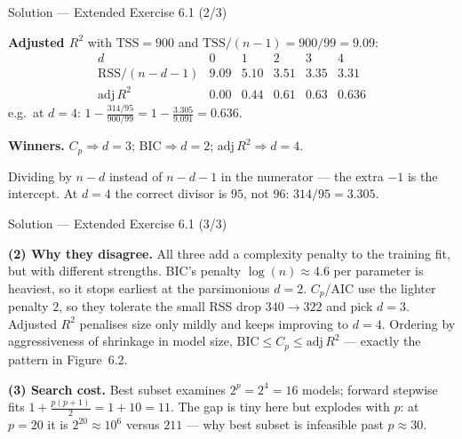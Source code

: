 \documentclass[aspectratio=169,11pt]{beamer}
\begin{document}
\begin{frame}{Solution --- Extended Exercise 6.1 (2/3)}
  \begin{solutionbox}
    \textbf{Adjusted $R^2$} with $\mathrm{TSS}=900$ and
    $\mathrm{TSS}/(n-1)=900/99=9.09$:
    \[
      \begin{array}{c|ccccc}
        d & 0 & 1 & 2 & 3 & 4\\\hline
        \mathrm{RSS}/(n\!-\!d\!-\!1) & 9.09 & 5.10 & 3.51 & 3.35 & 3.31\\[1pt]
        \mathrm{adj}\,R^2 & 0.00 & 0.44 & 0.61 & 0.63 & \mathbf{0.636}
      \end{array}
    \]
    e.g.\ at $d=4$: $1-\tfrac{314/95}{900/99}=1-\tfrac{3.305}{9.091}
    =0.636$.

    \textbf{Winners.} $C_p\Rightarrow d=3$;\quad
    $\mathrm{BIC}\Rightarrow d=2$;\quad
    $\mathrm{adj}\,R^2\Rightarrow d=4$.
  \end{solutionbox}
  \begin{mistake}
    Dividing by $n - d$ instead of $n - d - 1$ in the numerator --- the
    extra $-1$ is the intercept. At $d = 4$ the correct divisor is $95$,
    not $96$: $314/95 = 3.305$.
  \end{mistake}
\end{frame}

\begin{frame}{Solution --- Extended Exercise 6.1 (3/3)}
  \begin{solutionbox}
    \textbf{(2) Why they disagree.} All three add a complexity penalty
    to the training fit, but with different strengths. BIC's penalty
    $\log(n)\approx4.6$ per parameter is heaviest, so it stops earliest
    at the parsimonious $d=2$. $C_p$/AIC use the lighter penalty $2$, so
    they tolerate the small RSS drop $340\!\to\!322$ and pick $d=3$.
    Adjusted $R^2$ penalises size only mildly and keeps improving to
    $d=4$. Ordering by aggressiveness of shrinkage in model size,
    $\mathrm{BIC}\le C_p\le\mathrm{adj}\,R^2$ --- exactly the pattern in
    Figure~6.2.

    \textbf{(3) Search cost.} Best subset examines $2^p=2^4=16$ models;
    forward stepwise fits $1+\tfrac{p(p+1)}2=1+10=11$. The gap is tiny
    here but explodes with $p$: at $p=20$ it is $2^{20}\approx10^6$
    versus $211$ --- why best subset is infeasible past $p\approx30$.
  \end{solutionbox}
\end{frame}

\end{document}
